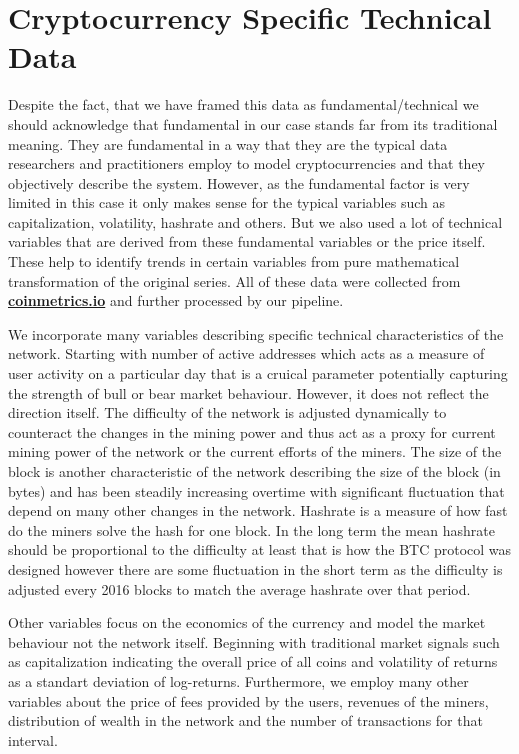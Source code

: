 \section{Cryptocurrency Specific Technical Data}

Despite the fact, that we have framed this data as fundamental/technical 
we should acknowledge that fundamental in our case stands far from its 
traditional meaning. They are fundamental in a way that they 
are the typical data researchers and practitioners employ to model cryptocurrencies
and that they objectively describe the system.
However, as the fundamental factor is very limited in this case it only makes sense
for the typical variables such as capitalization, volatility, hashrate and others.
But we also used a lot of technical variables that are derived from these fundamental
variables or the price itself. These help to identify trends in certain 
variables from pure mathematical transformation of the original series. 
All of these data were collected from \textbf{\href{https://coinmetrics.io/}{coinmetrics.io}}
and further processed by our pipeline.


We incorporate many variables describing specific technical characteristics of the network. Starting with number of active addresses
which acts as a measure of user activity on a particular day that is a cruical parameter potentially capturing the strength of 
bull or bear market behaviour. However, it does not reflect the direction itself. The difficulty of the network is
adjusted dynamically to counteract the changes in the mining power and thus act as a proxy for current mining power of the network or the current efforts of the miners. 
The size of the block is another characteristic of the network describing the size of the block (in bytes) and has been steadily increasing overtime
with significant fluctuation that depend on many other changes in the network. Hashrate is a measure of how
fast do the miners solve the hash for one block. In the long term the mean hashrate should be proportional to the difficulty at least that is how the 
\ac{BTC} protocol was designed however there are some fluctuation in the short term as the difficulty is adjusted every 2016 blocks 
to match the average hashrate over that period.


Other variables focus on the economics of the currency and model the market behaviour not the network itself. 
Beginning with traditional market signals such as capitalization indicating the overall price of all coins and volatility of returns 
as a standart deviation of log-returns. Furthermore, we employ many other variables about the price of fees 
provided by the users, revenues of the miners, distribution of wealth in the network and the number of transactions for that interval.


